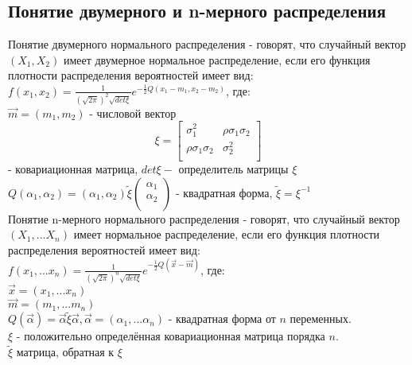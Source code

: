\subsection{Понятие двумерного и n-мерного распределения}
Понятие двумерного нормального распределения - говорят, что случайный вектор $(X_{1}, X_{2})$ имеет двумерное нормальное распределение, если его функция плотности распределения вероятностей имеет вид:\\
$f(x_{1}, x_{2}) = \frac{1}{(\sqrt{2\pi})^{2}\sqrt{det \xi}}e^{-\frac{1}{2}Q(x_{1} - m_{1}, x_{2} - m_{2})}$, где:\\
$\overrightarrow{m} = (m_{1}, m_{2})$ - числовой вектор\\
\begin{equation}
\xi = 
\left[
  \begin{array}{cc}
     \sigma_{1}^{2} & \rho \sigma_{1} \sigma_{2}\\
     \rho \sigma_{1} \sigma_{2} & \sigma_{2}^{2}\\
  \end{array}
\right]
\end{equation} - ковариационная матрица, $det \xi -$ определитель матрицы $\xi$\\
$Q(\alpha_{1}, \alpha_{2}) = (\alpha_{1}, \alpha_{2}) \tilde{\xi}
\left(
  \begin{array}{c}
	\alpha_{1}\\
	\alpha_{2}\\
  \end{array}
\right)$ - квадратная форма, $\tilde{\xi} = \xi^{-1}$\\


Понятие n-мерного нормального распределения - говорят, что случайный вектор $(X_{1}, ... X_{n})$ имеет нормальное распределение, если его функция плотности распределения вероятностей имеет вид:\\
$f(x_{1}, ... x_{n}) = \frac{1}{(\sqrt{2\pi})^{n}\sqrt{det \xi}}e^{-\frac{1}{2}Q(\overrightarrow{x} - \overrightarrow{m})}$, где:\\
$\overrightarrow{x} = (x_{1}, ... x_{n})$\\
$\overrightarrow{m} = (m_{1}, ... m_{n})$\\
$Q(\overrightarrow{\alpha}) = \overrightarrow{\alpha} \tilde{\xi} \overrightarrow{\alpha}, \overrightarrow{\alpha} = (\alpha_{1}, ... \alpha_{n})$ - квадратная форма от $n$ переменных.\\
$\xi$ - положительно определённая ковариационная матрица порядка $n$.\\
$\tilde{\xi}$ матрица, обратная к $\xi$\\

